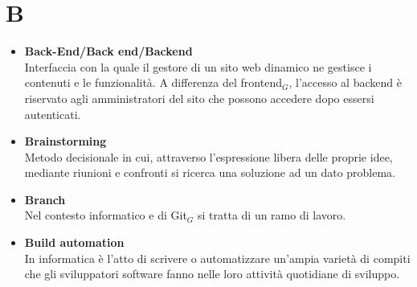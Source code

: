\chapter{B} \label{B}
\begin{itemize}
	\item \textbf{Back-End/Back end/Backend} \\
	Interfaccia con la quale il gestore di un sito web dinamico ne gestisce i contenuti e le funzionalità. A differenza del frontend$_G$, l'accesso al backend è riservato agli amministratori del sito che possono accedere dopo essersi autenticati.
	
	\item \textbf{Brainstorming} \\
	Metodo decisionale in cui, attraverso l’espressione libera delle proprie idee, mediante riunioni e confronti si ricerca una soluzione ad un dato problema.
	
	\item \textbf{Branch} \\
	Nel contesto informatico e di Git$_G$ si tratta di un ramo di lavoro.
	
		\item \textbf{Build automation} \\
	In informatica è l'atto di scrivere o automatizzare un'ampia varietà di compiti che gli sviluppatori software fanno nelle loro attività quotidiane di sviluppo.
\end{itemize}